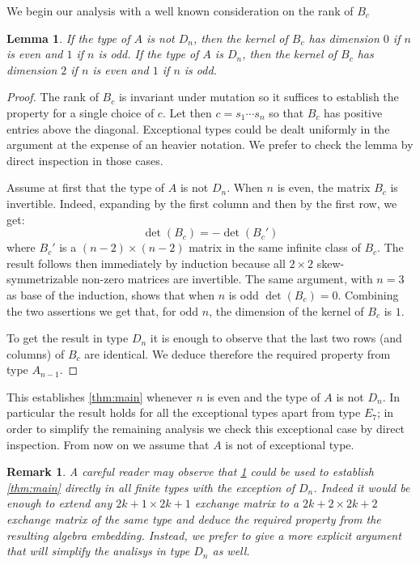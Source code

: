 \documentclass[11pt]{amsart}
\newtheorem{lemma}[theorem]{Lemma}
\newtheorem{remark}[theorem]{Remark}
\numberwithin{equation}{section}
\begin{document}
  We begin our analysis with a well known consideration on the rank of $B_c$ 
  \begin{lemma}
    \label{lem:dimensions}
    If the type of $A$ is not $D_n$, then the kernel of $B_c$ has dimension $0$ if $n$ is even and $1$ if $n$ is odd.
    If the type of $A$ is $D_n$, then the kernel of $B_c$ has dimension $2$ if $n$ is even and $1$ if $n$ is odd.
  \end{lemma}
  \begin{proof}
    The rank of $B_c$ is invariant under mutation so it suffices to establish the property for a single choice of $c$. 
    Let then $c=s_1\cdots s_n$ so that $B_c$ has positive entries above the diagonal.
    Exceptional types could be dealt uniformly in the argument at the expense of an heavier notation. 
    We prefer to check the lemma by direct inspection in those cases.

    Assume at first that the type of $A$ is not $D_n$.
    When $n$ is even, the matrix $B_c$ is invertible. 
    Indeed, expanding by the first column and then by the first row, we get:
    \[
      \det(B_c)=-\det(B_c')
    \]
    where $B_c'$ is a $(n-2)\times(n-2)$ matrix in the same infinite class of $B_c$. 
    The result follows then immediately by induction because all $2\times2$ skew-symmetrizable non-zero matrices are invertible.
    The same argument, with $n=3$ as base of the induction, shows that when $n$ is odd $\det(B_c)=0$.
    Combining the two assertions we get that, for odd $n$, the dimension of the kernel of $B_c$ is $1$.

    To get the result in type $D_n$ it is enough to observe that the last two rows (and columns) of $B_c$ are identical. 
    We deduce therefore the required property from type $A_{n-1}$.
  \end{proof}

  This establishes \cref{thm:main} whenever $n$ is even and the type of $A$ is not $D_n$.
  In particular the result holds for all the exceptional types apart from type $E_7$; in order to simplify the remaining analysis we check this exceptional case by direct inspection.
  From now on we assume that $A$ is not of exceptional type.

  \begin{remark}
    A careful reader may observe that \cref{lem:dimensions} could be used to establish \cref{thm:main} directly in all finite types with the exception of $D_n$. 
    Indeed it would be enough to extend any $2k+1 \times 2k+1$ exchange matrix to a $2k+2\times2k+2$ exchange matrix of the same type and deduce the required property from the resulting algebra embedding.
    Instead, we prefer to give a more explicit argument that will simplify the analisys in type $D_n$ as well.
  \end{remark}
\end{document}
